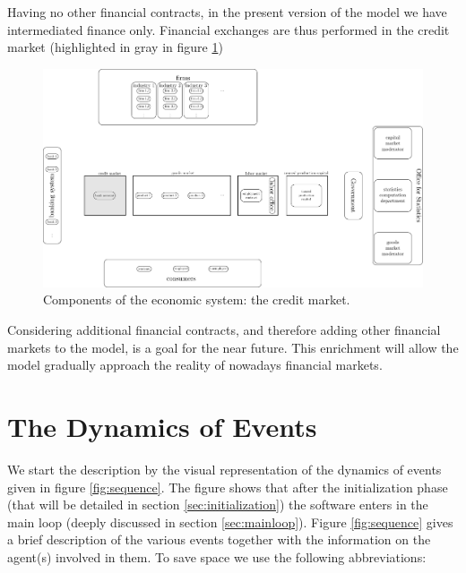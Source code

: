 \documentclass{book}
\begin{document}
Having no other financial contracts, in the present version of the model we have intermediated finance only. %
Financial exchanges are thus performed in the credit market (highlighted in gray in figure \ref{fig:componentsc3})

\begin{figure}[htp]
\hskip-1cm\includegraphics[scale=0.5]{agents_and_interactions_figure1c3-0.pdf}
	\caption{Components of the economic system: the credit market.}
	\label{fig:componentsc3}
\end{figure}

Considering additional financial contracts, and therefore adding other financial markets to the model, is a goal for the near future. This enrichment will allow the model gradually approach the reality of nowadays financial markets.




\newpage
\chapter{The Dynamics of Events}\label{chap:events}

We start the description by the visual representation of the dynamics of events given in figure \ref{fig:sequence}. The figure shows that after the initialization phase (that will be detailed in section \ref{sec:initialization}) the software enters in the main loop (deeply discussed in section \ref{sec:mainloop}). Figure \ref{fig:sequence} gives a brief description of the various events together with the information on the agent(s) involved in them. To save space we use the following abbreviations:
\end{document}
